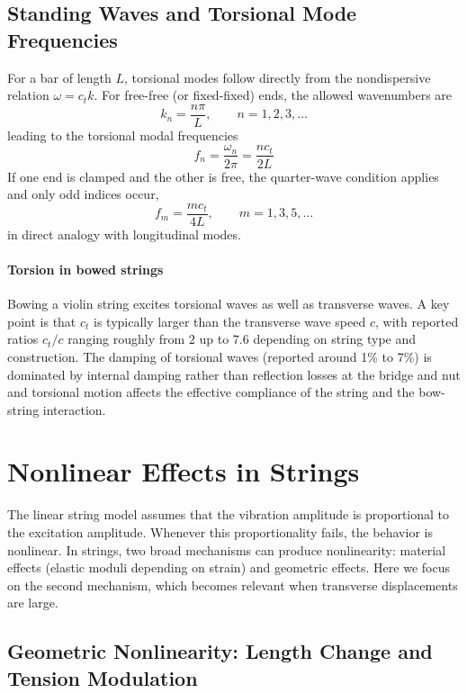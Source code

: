 \subsection{Standing Waves and Torsional Mode Frequencies}

For a bar of length \( L \), torsional modes follow directly from the nondispersive relation \( \omega = c_t k \). For free-free (or fixed-fixed) ends, the allowed wavenumbers are
\[
k_n = \frac{n\pi}{L},\qquad n = 1,2,3,\dots
\]
leading to the torsional modal frequencies
\[
f_n = \frac{\omega_n}{2\pi} = \frac{n c_t}{2L}
\]
If one end is clamped and the other is free, the quarter-wave condition applies and only odd indices occur,
\[
f_m = \frac{m c_t}{4L},\qquad m = 1,3,5,\dots
\]
in direct analogy with longitudinal modes. 

\paragraph{Torsion in bowed strings} Bowing a violin string excites torsional waves as well as transverse waves. A key point is that \( c_t \) is typically larger than the transverse wave speed \( c \), with reported ratios \( c_t/c \) ranging roughly from \( 2 \) up to \( 7.6 \) depending on string type and construction. The damping of torsional waves (reported around 1\% to 7\%) is dominated by internal damping rather than reflection losses at the bridge and nut and torsional motion affects the effective compliance of the string and the bow-string interaction.

\section{Nonlinear Effects in Strings}

The linear string model assumes that the vibration amplitude is proportional to the excitation amplitude. Whenever this proportionality fails, the behavior is nonlinear. In strings, two broad mechanisms can produce nonlinearity: material effects (elastic moduli depending on strain) and geometric effects. Here we focus on the second mechanism, which becomes relevant when transverse displacements are large.

\subsection{Geometric Nonlinearity: Length Change and Tension Modulation}

